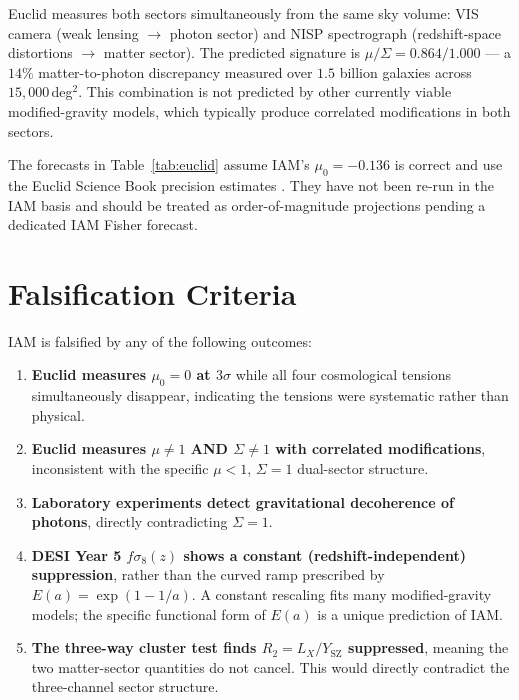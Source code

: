 \documentclass[12pt,a4paper]{article}
\begin{document}
Euclid measures both sectors simultaneously from the same sky volume: VIS camera
(weak lensing $\to$ photon sector) and NISP spectrograph (redshift-space distortions
$\to$ matter sector). The predicted signature is $\mu/\Sigma = 0.864/1.000$ --- a $14\%$
matter-to-photon discrepancy measured over $1.5$ billion galaxies across
$15{,}000$\,deg$^2$. This combination is not predicted by other currently viable
modified-gravity models, which typically produce correlated modifications in both sectors.

The forecasts in Table~\ref{tab:euclid} assume IAM's $\mu_0 = -0.136$ is correct and
use the Euclid Science Book precision estimates \citep{Euclid2020}. They have not been
re-run in the IAM basis and should be treated as order-of-magnitude projections pending
a dedicated IAM Fisher forecast.

\section{Falsification Criteria}
\label{sec:falsification}

IAM is falsified by any of the following outcomes:

\begin{enumerate}
  \item \textbf{Euclid measures $\mu_0 = 0$ at $3\sigma$} while all four cosmological
        tensions simultaneously disappear, indicating the tensions were systematic rather
        than physical.

  \item \textbf{Euclid measures $\mu \neq 1$ AND $\Sigma \neq 1$ with correlated
        modifications}, inconsistent with the specific $\mu < 1$, $\Sigma = 1$
        dual-sector structure.

  \item \textbf{Laboratory experiments detect gravitational decoherence of photons},
        directly contradicting $\Sigma = 1$.

  \item \textbf{DESI Year 5 $f\sigma_8(z)$ shows a constant (redshift-independent)
        suppression}, rather than the curved ramp prescribed by $E(a) = \exp(1-1/a)$.
        A constant rescaling fits many modified-gravity models; the specific functional
        form of $E(a)$ is a unique prediction of IAM.

  \item \textbf{The three-way cluster test finds $R_2 = L_X/Y_\mathrm{SZ}$
        suppressed}, meaning the two matter-sector quantities do not cancel.
        This would directly contradict the three-channel sector structure.
\end{enumerate}
\end{document}
